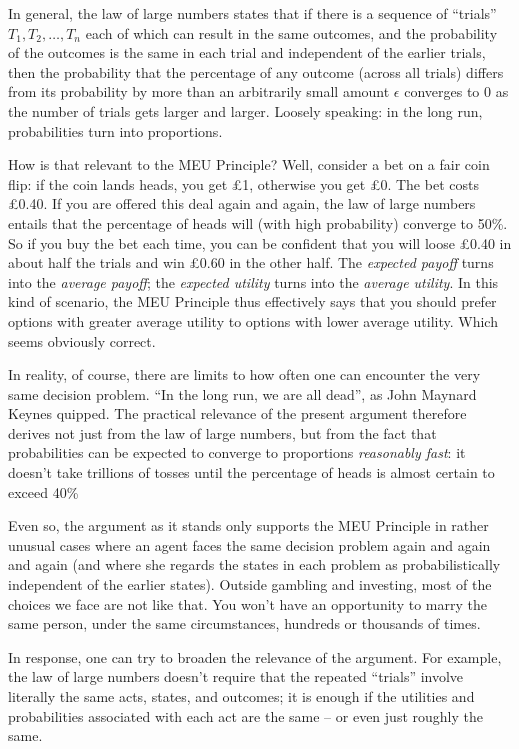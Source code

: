 In general, the law of large numbers states that if there is a sequence
of ``trials'' $T_1,T_2,\ldots,T_n$ each of which can result in the
same outcomes, and the probability of the outcomes is the same in each
trial and independent of the earlier trials, then the probability that
the percentage of any outcome (across all trials) differs from its
probability by more than an arbitrarily small amount $\epsilon$
converges to 0 as the number of trials gets larger and larger. Loosely
speaking: in the long run, probabilities turn into proportions.

How is that relevant to the MEU Principle? Well, consider a bet on a
fair coin flip: if the coin lands heads, you get £1, otherwise you get
£0. The bet costs £0.40. If you are offered this deal again and again,
the law of large numbers entails that the percentage of heads will
(with high probability) converge to 50\%. So if you buy the bet each
time, you can be confident that you will loose £0.40 in about half the
trials and win £0.60 in the other half. The \emph{expected payoff}
turns into the \emph{average payoff}; the \emph{expected utility}
turns into the \emph{average utility}. In this kind of scenario, the
MEU Principle thus effectively says that you should prefer options
with greater average utility to options with lower average
utility. Which seems obviously correct.

In reality, of course, there are limits to how often one can encounter
the very same decision problem. ``In the long run, we are all dead'',
as John Maynard Keynes quipped. The practical relevance of the present
argument therefore derives not just from the law of large numbers, but
from the fact that probabilities can be expected to converge to
proportions \emph{reasonably fast}: it doesn't take trillions of
tosses until the percentage of heads is almost certain to exceed 40\%

Even so, the argument as it stands only supports the MEU Principle in
rather unusual cases where an agent faces the same decision problem
again and again and again (and where she regards the states in each
problem as probabilistically independent of the earlier
states). Outside gambling and investing, most of the choices we face
are not like that. You won't have an opportunity to marry the same
person, under the same circumstances, hundreds or thousands of times.

In response, one can try to broaden the relevance of the argument. For
example, the law of large numbers doesn't require that the repeated
``trials'' involve literally the same acts, states, and outcomes; it
is enough if the utilities and probabilities associated with each act
are the same -- or even just roughly the same.

